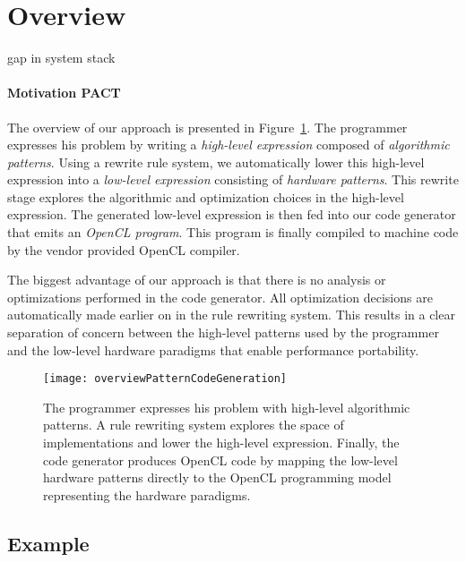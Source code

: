 \section{Overview}

gap in system stack

\paragraph{Motivation PACT}
The overview of our approach is presented in Figure~\ref{fig:highlevel}.
The programmer expresses his problem by writing a \emph{high-level expression} composed of \emph{algorithmic patterns}.
Using a rewrite rule system, we automatically lower this high-level expression into a \emph{low-level expression} consisting of \emph{hardware patterns}.
This rewrite stage explores the algorithmic and optimization choices in the high-level expression.
The generated low-level expression is then fed into our code generator that emits an \emph{OpenCL program}.
This program is finally compiled to machine code by the vendor provided OpenCL compiler.

The biggest advantage of our approach is that there is no analysis or optimizations performed in the code generator.
All optimization decisions are automatically made earlier on in the rule rewriting system.
This results in a clear separation of concern between the high-level patterns used by the programmer and the low-level hardware paradigms that enable performance portability.

\begin{figure}[t]
\centering
\texttt{[image: overviewPatternCodeGeneration]}
\vspace{-15pt}
\caption{
The programmer expresses his problem with high-level algorithmic patterns.
A rule rewriting system explores the space of implementations and lower the high-level expression.
Finally, the code generator produces OpenCL code by mapping the low-level hardware patterns directly to the OpenCL programming model representing the hardware paradigms.}
\label{fig:highlevel}
\end{figure}


\subsection{Example}

